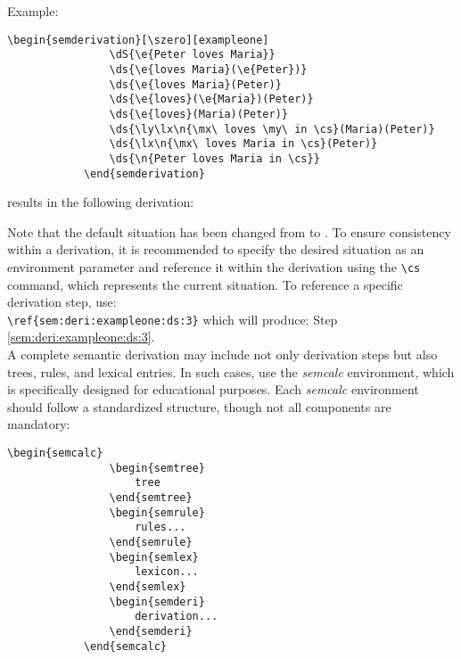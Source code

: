 \documentclass[10pt, a4paper]{article}
\begin{document}
	Example:
	\begin{lstlisting}[style=B]
			\begin{semderivation}[\szero][exampleone]
				\dS{\e{Peter loves Maria}}
				\ds{\e{loves Maria}(\e{Peter})}
				\ds{\e{loves Maria}(Peter)}
				\ds{\e{loves}(\e{Maria})(Peter)}
				\ds{\e{loves}(Maria)(Peter)}
				\ds{\ly\lx\n{\mx\ loves \my\ in \cs}(Maria)(Peter)}
				\ds{\lx\n{\mx\ loves Maria in \cs}(Peter)}
				\ds{\n{Peter loves Maria in \cs}}
			\end{semderivation}
	\end{lstlisting} 
	results in the following derivation: \begin{semderivation}[\szero][exampleone]
	\end{semderivation}
	Note that the default situation has been changed from \sstar to \szero. To ensure consistency within a derivation, it is recommended to specify the desired situation as an environment parameter and reference it within the derivation using the \verb=\cs= command, which represents the current situation. To reference a specific derivation step, use:
	\\\verb=\ref{sem:deri:exampleone:ds:3}=
	which will produce: Step \ref{sem:deri:exampleone:ds:3}.
	\\A complete semantic derivation may include not only derivation steps but also trees, rules, and lexical entries. In such cases, use the \textit{semcalc} environment, which is specifically designed for educational purposes. Each \textit{semcalc} environment should follow a standardized structure, though not all components are mandatory:
	\begin{lstlisting}[style=B]
			\begin{semcalc}
				\begin{semtree}
					tree
				\end{semtree}
				\begin{semrule}
					rules...
				\end{semrule}
				\begin{semlex}
					lexicon...
				\end{semlex}
				\begin{semderi}
					derivation...
				\end{semderi}
			\end{semcalc}
	\end{lstlisting}
\end{document}
